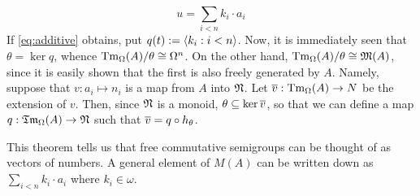 \begin{equation}
\label{eq:additive}
u = \sum_{i < n} k_i \cdot a_i
\end{equation}
If \eqref{eq:additive} obtains, put $q(t) := \langle k_i : i < n\rangle$. 
Now, it is immediately seen that $\theta = \ker q$, whence 
$\operatorname{Tm}_{\Omega}(A)/\theta \cong \Omega^n$. On the other 
hand, $\operatorname{Tm}_{\Omega}(A)/\theta \cong \mathfrak{M}(A)$, since 
it is easily shown that the first is also freely generated by $A$.
Namely, suppose that $v : a_i \mapsto n_i$ is a map from $A$ into 
$\mathfrak{N}$. Let $\overline{v} : \operatorname{Tm}_{\Omega}(A) \rightarrow N$ be the extension of 
$v$. Then, since $\mathfrak{N}$ is a monoid, $\theta \subseteq \ker \overline{v}$, 
so that we can define a map $q : \mathfrak{Tm}_{\Omega}(A) \rightarrow \mathfrak{N}$ 
such that $\overline{v} = q \circ h_{\theta}$. 
\proofend

This theorem tells us that free commutative semigroups can be
thought of as vectors of numbers. A general element of $M(A)$
can be written down as $\sum_{i < n} k_i \cdot a_i$
where $k_i \in \omega$.

